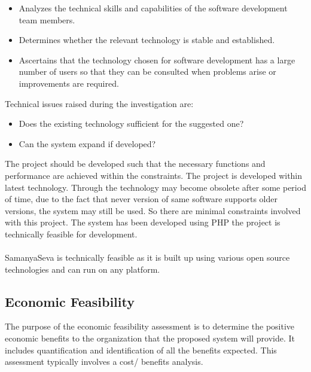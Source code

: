 \begin{itemize}
	\item Analyzes the technical skills and capabilities of the software development team members.
	\item Determines whether the relevant technology is stable and established.
	\item Ascertains that the technology chosen for software development has a large number of users so that they can be consulted when problems arise or improvements are required.
\end{itemize}

Technical issues raised during the investigation are:
\begin{itemize}
	\item Does the existing technology sufficient for the suggested one?
	\item Can the system expand if developed?
\end{itemize}

The project should be developed such that the necessary functions and performance are achieved within the constraints. The project is developed within latest technology. Through the technology may become obsolete after some period of time, due to the fact that never version of same software supports older versions, the system may still be used. So there are minimal constraints involved with this project. The system has been developed using PHP the project is technically feasible for development.\\\\
SamanyaSeva is technically feasible as it is built up using various open source technologies and can run on any platform.

\subsection{Economic Feasibility}
The purpose of the economic feasibility assessment is to determine the positive economic benefits to the organization that the proposed system will provide. It includes quantification and identification of all the benefits expected. This assessment typically involves a cost/ benefits analysis.

